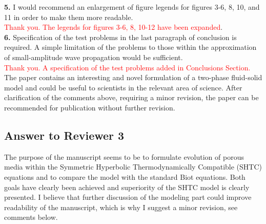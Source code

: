 \documentclass[3p,times,table]{article}
\newcommand{\revOne}[1]{\textcolor{Red}{#1}}
\begin{document}
\textbf{5.}      I would recommend an enlargement of figure legends for figures 3-6, 8, 10, and 11 
in order 
to make them more readable.
\\
\revOne{Thank you. The legends for figures 3-6, 8, 10-12 have been 
expanded}.
\\

\textbf{6.}      Specification of the test problems in the last paragraph of conclusion is 
required. A 
simple limitation of the problems to those within the approximation of small-amplitude wave 
propagation would be sufficient.
\\
\revOne{Thank you. A specification of the test problems added in 
Conclusions Section.}
\\

The paper contains an interesting and novel formulation of a two-phase fluid-solid model and could 
be useful to scientists in the relevant area of science. After clarification of the comments above, 
requiring a minor revision, the paper can be recommended for publication without further revision.
\newpage

\subsection*{Answer to Reviewer 3}
The purpose of the manuscript seems to be to formulate evolution of porous media within the 
Symmetric Hyperbolic Thermodynamically Compatible (SHTC) equations and to compare the model with 
the standard Biot equations. Both goals have clearly been achieved and superiority of the SHTC 
model is clearly presented. I believe that further discussion of the modeling part could improve 
readability of the manuscript, which is why I suggest a minor revision, see comments below.
\\
\end{document}
